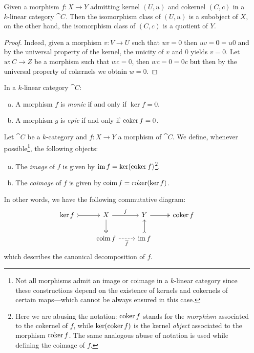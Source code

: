\begin{corollary}
\label{cor:k-linear-cat-kernel-is-subobject}
Given a morphism \(f: X \to Y\) admitting kernel \((U, u)\) and cokernel
\((C, c)\) in a \(k\)-linear category \(\cat C\). Then the isomorphism class of
\((U, u)\) is a subobject of \(X\), on the other hand, the isomorphism class of
\((C, c)\) is a quotient of \(Y\).
\end{corollary}

\begin{proof}
Indeed, given a morphism \(v: V \to U\) such that \(u v = 0\) then \(u v = 0 = u
0\) and by the universal property of the kernel, the unicity of \(v\) and \(0\)
yields \(v = 0\). Let \(w: C \to Z\) be a morphism such that \(w c = 0\), then \(w
c = 0 = 0 c\) but then by the universal property of cokernels we obtain \(w = 0\).
\end{proof}

\begin{lemma}
\label{lem:k-linear-cat-monic-epic-iff-ker-coker-zero}
In a \(k\)-linear category \(\cat C\):
\begin{enumerate}[(a)]\setlength\itemsep{0em}
\item A morphism \(f\) is \emph{monic} if and only if \(\ker f = 0\).
\item A morphism \(g\) is \emph{epic} if and only if \(\operatorname{coker} f = 0\).
\end{enumerate}
\end{lemma}

\begin{definition}[(Co)image]
\label{def:k-linear-cat-image-coimage}
Let \(\cat C\) be a \(k\)-category and \(f: X \to Y\) a morphism of \(\cat C\). We
define, whenever possible\footnote{Not all morphisms admit an image or coimage
  in a \(k\)-linear category since these constructions depend on the existence
  of kernels and cokernels of certain maps---which cannot be always ensured in
  this case.}, the following objects:
\begin{enumerate}[(a)]\setlength\itemsep{0em}
\item The \emph{image} of \(f\) is given by
  \(\operatorname{im} f = \ker(\operatorname{coker} f)\)\footnote{Here we are abusing the notation:
    \(\operatorname{coker} f\) stands for the \emph{morphism} associated to the cokernel of
    \(f\), while \(\ker(\operatorname{coker} f)\) is the kernel \emph{object} associated to
    the morphism \(\operatorname{coker} f\). The same analogous abuse of notation is used
    while defining the coimage of \(f\).}.

\item The \emph{coimage} of \(f\) is given by \(\operatorname{coim} f = \operatorname{coker}(\ker f)\).
\end{enumerate}
In other words, we have the following commutative diagram:
\[
\begin{tikzcd}
\ker f \ar[r, tail]
&X \ar[r, "f"] \ar[d, two heads]
&Y \ar[r, two heads]
&\coker f
\\
&\coim f \ar[r, dashed, "\overline f"']
&\im f \ar[u, tail]
&
\end{tikzcd}
\]
which describes the canonical decomposition of \(f\).
\end{definition}

